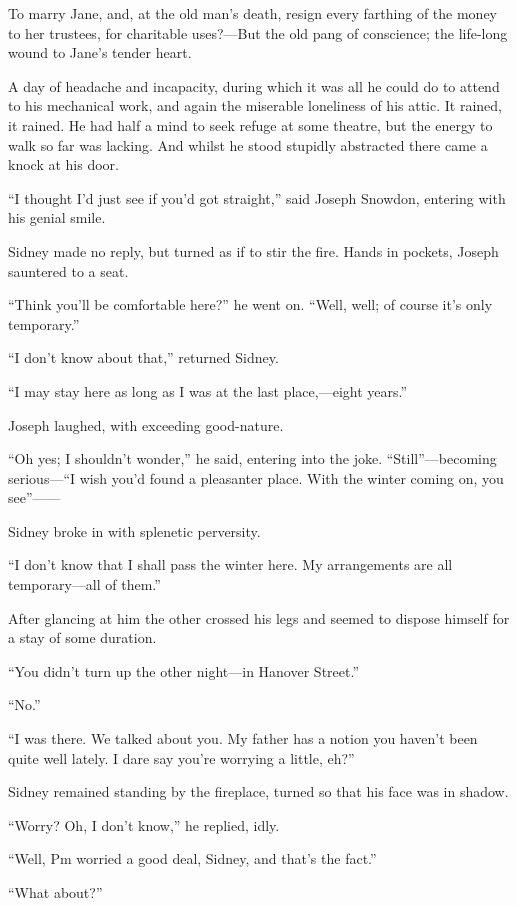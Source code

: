 To marry Jane, and, at the old man's death, resign every farthing of the
money to her trustees, for charitable uses?---But the old pang of
conscience; the life-long wound to Jane's tender heart.

{}A day of headache and incapacity, during which it was all he could do
to attend to his mechanical work, and again the miserable loneliness of
his attic. It rained, it rained. He had half a mind to seek refuge at
some theatre, but the energy to walk so far was lacking. And whilst he
stood stupidly abstracted there came a knock at his door.

``I thought I'd just see if you'd got straight,'' said Joseph Snowdon,
entering with his genial smile.

Sidney made no reply, but turned as if to stir the fire. Hands in
pockets, Joseph sauntered to a seat.

``Think you'll be comfortable here?'' he went on. ``Well, well; of
course it's only temporary.''

``I don't know about that,'' returned Sidney.

``I may stay here as long as I was at the last place,---eight years.''

Joseph laughed, with exceeding good-nature.

``Oh yes; I shouldn't wonder,'' he said, entering into the joke.
``Still''---becoming {}serious---``I wish you'd found a pleasanter
place. With the winter coming on, you see''{{------}}

Sidney broke in with splenetic perversity.

``I don't know that I shall pass the winter here. My arrangements are
all temporary---all of them.''

After glancing at him the other crossed his legs and seemed to dispose
himself for a stay of some duration.

``You didn't turn up the other night---in Hanover Street.''

``No.''

``I was there. We talked about you. My father has a notion you haven't
been quite well lately. I dare say you're worrying a little, eh?''

Sidney remained standing by the fireplace, turned so that his face was
in shadow.

``Worry? Oh, I don't know,'' he replied, idly.

``Well, Pm worried a good deal, Sidney, and that's the fact.''

``What about?''

